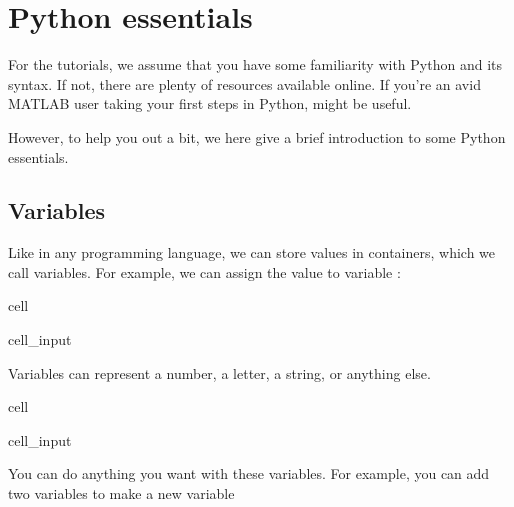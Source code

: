 \documentclass[letterpaper,10pt,english]{jupyterBook}
\begin{document}
\chapter{Python essentials}
\label{\detokenize{notebooks/Tutorial1_NumpySimpleITK/Tutorial1_NumpySimpleITK_student:python-essentials}}
\sphinxAtStartPar
For the tutorials, we assume that you have some familiarity with Python and its syntax. If not, there are plenty of resources available online. If you’re an avid MATLAB user taking your first steps in Python,  might be useful.

\sphinxAtStartPar
However, to help you out a bit, we here give a brief introduction to some Python essentials.


\section{Variables}
\label{\detokenize{notebooks/Tutorial1_NumpySimpleITK/Tutorial1_NumpySimpleITK_student:variables}}
\sphinxAtStartPar
Like in any programming language, we can store values in containers, which we call variables. For example, we can assign the value  to variable :

\begin{sphinxuseclass}{cell}\begin{sphinxVerbatimInput}

\begin{sphinxuseclass}{cell_input}
\begin{sphinxVerbatim}[commandchars=\\\{\}]
  
\end{sphinxVerbatim}

\end{sphinxuseclass}\end{sphinxVerbatimInput}

\end{sphinxuseclass}
\sphinxAtStartPar
Variables can represent a number, a letter, a string, or anything else.

\begin{sphinxuseclass}{cell}\begin{sphinxVerbatimInput}

\begin{sphinxuseclass}{cell_input}
\begin{sphinxVerbatim}[commandchars=\\\{\}]
  
  
  
  
\end{sphinxVerbatim}

\end{sphinxuseclass}\end{sphinxVerbatimInput}

\end{sphinxuseclass}
\sphinxAtStartPar
You can do anything you want with these variables. For example, you can add two variables to make a new variable
\end{document}
